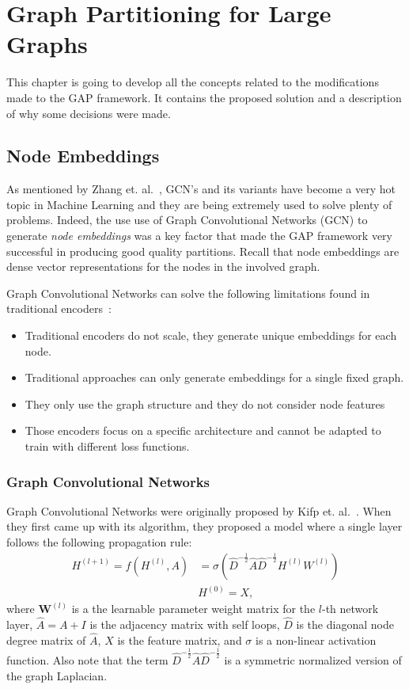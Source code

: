 %
%
\let\textcircled=\pgftextcircled
\chapter{Graph Partitioning for Large Graphs}
\label{Chapter3}
This chapter is going to develop all the concepts related to the modifications made to the GAP framework. It contains the proposed solution and a description of why some decisions were made.

\section{Node Embeddings}
As mentioned by Zhang et. al.~\cite{gcnreview}, GCN's and its variants have become a very hot topic in Machine Learning and they are being extremely used to solve plenty of problems. Indeed, the use use of Graph Convolutional Networks (GCN) to generate \textit{node embeddings} was a key factor that made the GAP framework very successful in producing good quality partitions. Recall that node embeddings are dense vector representations for the nodes in the involved graph.

Graph Convolutional Networks can solve the following limitations found in traditional encoders~\cite{encoderlimitations}:
\begin{itemize}
    \item Traditional encoders do not scale, they generate unique embeddings for each node.
    \item Traditional approaches can only generate embeddings for a single fixed graph.
    \item They only use the graph structure and they do not consider node features 
    \item Those encoders focus on a specific architecture and cannot be adapted to train with different loss functions.
\end{itemize}

\subsection{Graph Convolutional Networks}
Graph Convolutional Networks were originally proposed by Kifp et. al.~\cite{gcn}. When they first came up with its algorithm, they proposed a model where a single layer follows the following propagation rule:
\begin{align}
    \label{eq:gcn}
    H^{(l+1)} = f(H^{(l)}, A) &= \sigma\left(\hat{D}^{-\frac{1}{2}}\hat{A}\hat{D}^{-\frac{1}{2}}H^{(l)}W^{(l)}\right) \\
    & H^{(0)} = X,
\end{align}
where $\boldsymbol W^{(l)}$ is a the learnable parameter weight matrix for the $l$-th network layer, $\hat{A}=A+I$ is the adjacency matrix with self loops, $\hat{D}$ is the diagonal node degree matrix of $\hat{A}$, $X$ is the feature matrix, and $\sigma$ is a non-linear activation function. Also note that the term $\hat{D}^{-\frac{1}{2}}\hat{A}\hat{D}^{-\frac{1}{2}}$ is a symmetric normalized version of the graph Laplacian.

